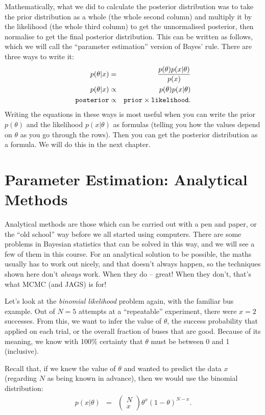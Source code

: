 Mathematically, what we did to calculate the posterior distribution was to
take the prior distribution as a whole (the whole second column) and multiply it
by the likelihood (the whole third column) to get the
unnormalised posterior, then normalise to get the final posterior distribution.
This can be written as follows, which we will call the ``parameter estimation''
version of Bayes' rule. There are three ways to write it:
\begin{eqnarray}
p(\theta | x) &=& \frac{p(\theta)p(x|\theta)}{p(x)}\\
p(\theta | x) &\propto& p(\theta)p(x|\theta)\\
{\tt posterior} &\propto& {\tt prior}\times{\tt likelihood}.
\end{eqnarray}
Writing the equations in these ways is most useful when you can write the
prior $p(\theta)$ and the likelihood $p(x|\theta)$ as formulas (telling you
how the values depend on $\theta$ as you go through the rows). Then you can get the
posterior distribution as a formula. We will do this in the next chapter.

\chapter{Parameter Estimation: Analytical Methods}
Analytical methods are those which can be carried out with a pen and paper,
or the ``old school'' way before we all started using computers. There are some
problems in Bayesian statistics that can be solved in this way, and we will
see a few of them in this course. For an analytical solution to be possible, the
maths usually has to work out nicely, and that doesn't always happen, so
the techniques shown here don't {\it always} work. When they do -- great! When
they don't, that's what MCMC (and JAGS) is for!

Let's look at the {\it binomial likelihood} problem again, with the familiar
bus example. Out of $N=5$ attempts at a ``repeatable'' experiment, there were
$x=2$ successes. From this, we want to infer the value of $\theta$, the
success probability that applied on each trial, or the overall fraction of 
buses that are good. Because of its meaning, we know
with 100\% certainty that $\theta$ must be between 0 and 1 (inclusive).

Recall that, if we knew the
value of $\theta$ and wanted to predict the data $x$ (regarding $N$ as being
known in advance), then we would use the binomial distribution:
\begin{eqnarray}
p(x|\theta) &=& \left(\begin{array}{c}N \\ x\end{array}\right)
\theta^x\left(1-\theta\right)^{N - x}.\label{eq:binomial_likelihood}
\end{eqnarray}

